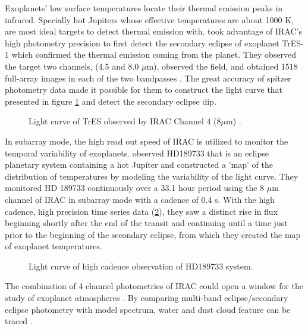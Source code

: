 \documentclass[preprint, 12pt]{aastex} \synctex=1
\begin{document}
Exoplanets' low surface temperatures locate their thermal emission
peaks in infrared. Specially hot Jupiters whose effective temperatures
are about 1000 K, are most ideal targets to detect thermal emission
with. \citet{2005ApJ...626..523C} took advantage of IRAC's high
photometry precision to first detect the secondary eclipse of
exoplanet TrES-1 which confirmed the thermal emission coming from the
planet. They observed the target two channels, (4.5 and 8.0 $\mu$m),
observed the field, and obtained 1518 full-array images in each of the
two bandpasses \citep{2005ApJ...626..523C}. The great accuracy of
spitzer photometry data made it possible for them to construct the
light curve that presented in figure \ref{fig:irac-lc} and detect the
secondary eclipse dip.\par

\begin{figure} \centering {}
  \caption{Light curve of TrES observed by IRAC Channel 4 (8$\mu$m)
\citep{2005ApJ...626..523C}.}
  \label{fig:irac-lc}
\end{figure}

In subarray mode, the high read out speed of IRAC is utilized to
monitor the temporal variability of
exoplanets. \citet{2007Natur.447..183K} observed HD189733 that is an
eclipse planetary system containing a hot Jupiter and constructed a
’map’ of the distribution of temperatures by modeling the variability
of the light curve. They monitored HD 189733 continuously over a 33.1
hour period using the 8 $\mu$m channel of IRAC in subarray mode with a
cadence of 0.4 s. With the high cadence, high precision time series
data (\ref{fig:iraf-lc2}), they saw a distinct rise in flux beginning
shortly after the end of the transit and continuing until a time just
prior to the beginning of the secondary eclipse, from which they
created the map of exoplanet temperatures.\par

\begin{figure} \centering {}
  \caption{Light curve of high cadence observation of HD189733
system\citep{2007Natur.447..183K}. }
  \label{fig:iraf-lc2}
\end{figure}

The combination of 4 channel photometries of IRAC could open a window
for the study of exoplanet atmospheres \citep{2014PNAS..11112601B}. By
comparing multi-band eclipse/secondary eclipse photometry with model
spectrum, water and dust cloud feature can be traced
\citep{2010ApJ...710.1551O}.
\end{document}
